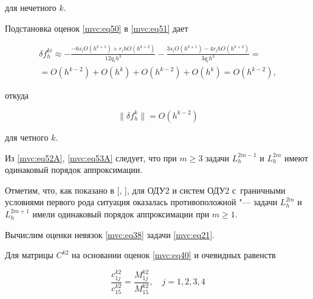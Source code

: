 для нечетного $k$.



Подстановка оценок \eqref{mvc:eq50} в \eqref{mvc:eq51} дает

\begin{multline}

\label{mvc:eq53}

   \delta f_{h}^{ki}

\approx-\frac{-6s_i O(h^{k+1})+r_ih O(h^{k+2})}{12q_ih^{3}}-


\frac{3s_i O(h^{k+1})-4r_ih O(h^{k+2})}{3q_ih^{3}}=

\\

=O(h^{k-2})+O(h^{k})+O(h^{k-2})+O(h^{k})=O(h^{k-2}),

\end{multline}

откуда

\begin{equation}

\label{mvc:eq53A}

\|\delta f_h^k\|=O(h^{k-2})

\end{equation}

для четного $k$.







Из \eqref{mvc:eq52A}, \eqref{mvc:eq53A} следует, что при $   m\geq3$ задачи  $   L_h^{2m-1}$ и $   L_h^{2m}$ имеют одинаковый порядок аппроксимации. 

Отметим, что, как показано в [, ], для ОДУ2 и систем ОДУ2 с~граничными условиями первого рода ситуация оказалась противоположной "--- задачи  $   L_h^{2m}$ и $   L_h^{2m+1}$ имели одинаковый порядок аппроксимации при $   m\geq1$.



Вычислим оценки невязок \eqref{mvc:eq38} задачи \eqref{mvc:eq21}.

Для матрицы $C^{k2}$ на основании оценок \eqref{mvc:eq40} и очевидных равенств

\begin{equation}

\label{mvc:eq54}

   \frac{c_{1j}^{k2}}{c_{15}^{k2}}=\frac{M_{1j}^{k2}}{M_{15}^{k2}},\quad 

j=1,  2,  3,  4

\end{equation}

